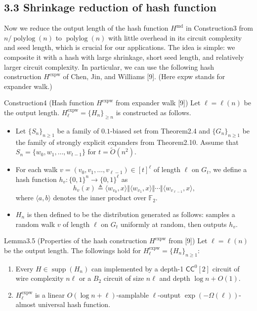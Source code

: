\subsection*{3.3 Shrinkage reduction of hash function}
Now we reduce the output length of the hash function $H^{\mathrm{md}}$ in Construction3 from $n/\operatorname{polylog}(n)$ to $\operatorname{polylog}(n)$ with little overhead in its circuit complexity and seed length, which is crucial for our applications. The idea is simple: we composite it with a hash with large shrinkage, short seed length, and relatively larger circuit complexity. In particular, we can use the following hash construction $H^{\mathrm{expw}}$ of Chen, Jin, and Williams [9]. (Here expw stands for expander walk.)
\begin{authorclaim}{Construction4 (Hash function $H^{\mathrm{expw}}$ from expander walk [9])}
Let $\ell=\ell(n)$ be the output length. $H^{\mathrm{expw}}_\ell=\{H_n\}_{\ge n}$ is constructed as follows.
\begin{itemize}
\item Let $\{S_n\}_{n\ge1}$ be a family of $0.1$-biased set from Theorem2.4 and $\{G_n\}_{n\ge1}$ be the family of strongly explicit expanders from Theorem2.10. Assume that $S_n=\{w_0,w_1,\ldots,w_{t-1}\}$ for $t=\widetilde O(n^2)$.
\item For each walk $v=(v_0,v_1,\ldots,v_{\ell-1})\in[t]^\ell$ of length $\ell$ on $G_t$, we define a hash function $h_v:\{0,1\}^n\to\{0,1\}^\ell$ as
\[h_v(x)\triangleq\langle w_{v_0},x\rangle\Vert\langle w_{v_1},x\rangle\Vert\cdots\Vert\langle w_{v_{\ell-1}},x\rangle,\]
where $\langle a,b\rangle$ denotes the inner product over $\mathbb F_2$.
\item $H_n$ is then defined to be the distribution generated as follows: samples a random walk $v$ of length $\ell$ on $G_t$ uniformly at random, then outputs $h_v$.
\end{itemize}
\end{authorclaim}
\begin{authorclaim}{Lemma3.5 (Properties of the hash construction $H^{\mathrm{expw}}$ from [9])}
Let $\ell=\ell(n)$ be the output length. The followings hold for $H^{\mathrm{expw}}_\ell=\{H_n\}_{n\ge1}$:
\begin{enumerate}
\item Every $H\in\operatorname{supp}(H_n)$ can implemented by a depth-1 $\mathsf{CC}^0[2]$ circuit of wire complexity $n\ell$ or a $B_2$ circuit of size $n\ell$ and depth $\log n+O(1)$.
\item $H^{\mathrm{expw}}_\ell$ is a linear $O(\log n+\ell)$-samplable $\ell$-output $\exp(-\Omega(\ell))$-almost universal hash function.
\end{enumerate}
\end{authorclaim}
